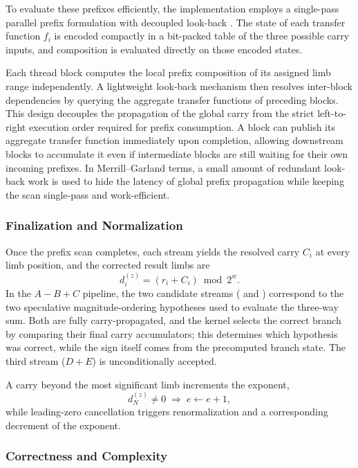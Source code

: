 To evaluate these prefixes efficiently, the implementation employs a single-pass parallel prefix formulation with decoupled look-back \cite{merrill2016single}. The state of each transfer function $f_i$ is encoded compactly in a bit-packed table of the three possible carry inputs, and composition is evaluated directly on those encoded states.

Each thread block computes the local prefix composition of its assigned limb range independently. A lightweight look-back mechanism then resolves inter-block dependencies by querying the aggregate transfer functions of preceding blocks. This design decouples the propagation of the global carry from the strict left-to-right execution order required for prefix consumption. A block can publish its aggregate transfer function immediately upon completion, allowing downstream blocks to accumulate it even if intermediate blocks are still waiting for their own incoming prefixes. In Merrill--Garland terms, a small amount of redundant look-back work is used to hide the latency of global prefix propagation while keeping the scan single-pass and work-efficient.

\subsubsection{Finalization and Normalization}

Once the prefix scan completes, each stream yields the resolved carry $C_i$ at every limb position, and the corrected result limbs are
\begin{equation}
d_i^{(z)} = (r_i + C_i) \bmod 2^w.
\end{equation}
In the $A - B + C$ pipeline, the two candidate streams ( and ) correspond to the two speculative magnitude-ordering hypotheses used to evaluate the three-way sum. Both are fully carry-propagated, and the kernel selects the correct branch by comparing their final carry accumulators; this determines which hypothesis was correct, while the sign itself comes from the precomputed branch state. The third stream ($D + E$) is unconditionally accepted.

A carry beyond the most significant limb increments the exponent,
\[
d_N^{(z)} \neq 0 \;\Rightarrow\; e \leftarrow e + 1,
\]
while leading-zero cancellation triggers renormalization and a corresponding
decrement of the exponent.

\subsubsection{Correctness and Complexity}

